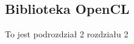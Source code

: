 \documentclass[document.tex]{subfiles}
\begin{document}







\subsection{Biblioteka OpenCL}
To jest podrozdział 2 rozdziału 2

\end{document}
